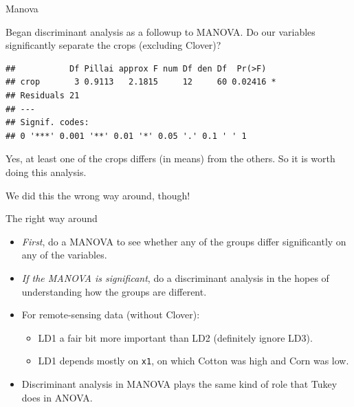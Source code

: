 \begin{frame}[fragile]{Manova}
  
Began discriminant analysis as a followup to MANOVA. Do our variables
significantly separate the crops (excluding Clover)?

\begin{knitrout}
\color{fgcolor}\begin{kframe}
\begin{alltt}
\hlkwb{=}
\hlkwb{=}\hlopt{~}
\end{alltt}
\begin{verbatim}
##           Df Pillai approx F num Df den Df  Pr(>F)  
## crop       3 0.9113   2.1815     12     60 0.02416 *
## Residuals 21                                        
## ---
## Signif. codes:  
## 0 '***' 0.001 '**' 0.01 '*' 0.05 '.' 0.1 ' ' 1
\end{verbatim}
\end{kframe}
\end{knitrout}

Yes, at least one of the crops differs (in means) from the others. So
it is worth doing this analysis.

We did this the wrong way around, though!
  
\end{frame}

\begin{frame}[fragile]{The right way around}
  
  \begin{itemize}
  \item \emph{First}, do a MANOVA to see whether any of the groups
    differ significantly on any of the variables.
  \item \emph{If the MANOVA is significant}, do a discriminant
    analysis in the hopes of understanding how the groups are different.
  \item For remote-sensing data (without Clover):
    \begin{itemize}
    \item LD1 a fair bit more important than LD2 (definitely ignore LD3).
    \item LD1 depends mostly on \texttt{x1}, on which Cotton was high
      and Corn was low. 
    \end{itemize}

  \item Discriminant analysis in MANOVA plays the same kind of role
    that Tukey does in ANOVA.
  \end{itemize}
  
\end{frame}





